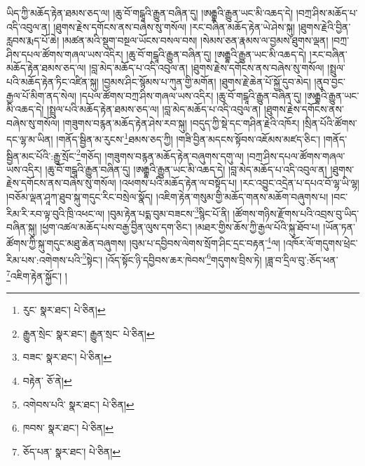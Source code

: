 ཡིད་ཀྱི་མཆོད་རྟེན་ཐམས་ཅད་ལ། །ཆུ་བོ་གངྒཱའི་རྒྱུན་བཞིན་དུ། །ཨརྒྷའི་རྒྱུན་ཡང་མི་འཆད་དེ། །བཀྲ་ཤིས་མཆོད་པ་འདི་འབུལ་ན། །ཐུགས་རྗེས་དགོངས་ནས་བཞེས་སུ་གསོལ། །རང་བཞིན་མཆོད་རྟེན་ཡེ་ཤེས་སྐུ། །ཐུགས་རྗེའི་བྱིན་རླབས་རྨད་པོ་ཆེ། །མཚན་མའི་སྡུག་བསྔལ་ཡོངས་བསལ་བས། །སེམས་ཅན་རྣམས་ལ་བྱམས་ཐུགས་ལྡན། །བཀྲ་ཤིས་དཔལ་ཚོགས་གཞལ་ཡས་འདིར། །ཆུ་བོ་གངྒཱའི་རྒྱུན་བཞིན་དུ། །ཨརྒྷའི་རྒྱུན་ཡང་མི་འཆད་དེ། །རང་བཞིན་མཆོད་རྟེན་ཐམས་ཅད་ལ། །བླ་མེད་མཆོད་པ་འདི་འབུལ་ན། །ཐུགས་རྗེས་དགོངས་ནས་བཞེས་སུ་གསོལ། །སྤྲུལ་པའི་མཆོད་རྟེན་ཏིང་འཛིན་སྐུ། །བྱམས་ཤིང་སྙོམས་པ་ཀུན་གྱི་མགོན། །ཐུགས་རྗེ་ཆེན་པོ་སྐྱོ་དུབ་མེད། །ནུབ་བྱང་རྒྱལ་པོ་མིག་ནད་སེལ། །དཔལ་ཚོགས་བཀྲ་ཤིས་གཞལ་ཡས་འདིར། །ཆུ་བོ་གངྒཱའི་རྒྱུན་བཞིན་དུ། །ཨརྒྷའི་རྒྱུན་ཡང་མི་འཆད་དེ། །སྤྲུལ་པའི་མཆོད་རྟེན་ཐམས་ཅད་ལ། །བླ་མེད་མཆོད་པ་འདི་འབུལ་ན། །ཐུགས་རྗེས་དགོངས་ནས་བཞེས་སུ་གསོལ། །གཟུགས་བརྙན་མཆོད་རྟེན་ཤེས་རབ་སྐུ། །བདུད་ཀྱི་སྡེ་དང་གཤིན་རྗེའི་འཁོར། །སྲིན་པོའི་ཚོགས་དང་ལྷ་མ་ཡིན། །གནོད་སྦྱིན་མ་རུངས་\footnote{རུང་  སྣར་ཐང་།  པེ་ཅིན། }ཐམས་ཅད་ཀྱི། །གཟི་བྱིན་མདངས་སྟོབས་འཇོམས་མཛད་ཅིང་། །གནོད་སྦྱིན་མང་པོའི་:རྒྱུ་སྲོང་\footnote{རྒྱུན་སྲེང་  སྣར་ཐང་། རྒྱུན་སྲང་  པེ་ཅིན། }གཅོད། །གཟུགས་བརྙན་མཆོད་རྟེན་བཞུགས་དགུ་ལ། །བཀྲ་ཤིས་དཔལ་ཚོགས་གཞལ་ཡས་འདིར། །ཆུ་བོ་གངྒཱའི་རྒྱུན་བཞིན་དུ། །ཨརྒྷའི་རྒྱུན་ཡང་མི་འཆད་དེ། །བླ་མེད་མཆོད་པ་འདི་འབུལ་ན། །ཐུགས་རྗེས་དགོངས་ནས་བཞེས་སུ་གསོལ། །འཕགས་པའི་མཆོད་རྟེན་ལ་བསྟོད་པ། །རང་འབྱུང་འདྲེན་པ་དཔའ་བོ་ལྷ་ཡི་ལྷ། །བཅོམ་ལྡན་ཤཱཀ་ཐུབ་སྐུ་གདུང་རིང་བསྲེལ་སྣོད། །འཇིག་རྟེན་གསུམ་གྱི་མཆོད་གནས་མཆོག་བཞུགས་པ། །བང་རིམ་རི་རབ་ལྟ་བུའི་ཁྲི་འཕང་ལ། །བུམ་རྟེན་པདྨ་བུམ་བཟངས་\footnote{བཟང་  སྣར་ཐང་།  པེ་ཅིན། }སྙིང་པོ་ནི། །ཚོགས་གཉིས་རྫོགས་པའི་འབྲས་བུ་ཡིད་བཞིན་སྐུ། །ཕྱག་འཚལ་མཆོད་པས་བརྒྱ་བྱིན་ལུས་དག་ཅིང་། །མཐར་གྱིས་ཆོས་ཀྱི་རྒྱལ་པོའི་སྐུ་ཐོབ་པ། །ཡོན་ཏན་ཚོགས་ཀྱི་སྐུ་གདུང་མཐུ་ཆེན་བཞུགས། །བུམ་པ་དབྱིབས་ལེགས་སྲོག་ཤིང་དྲང་བརྟན་\footnote{བརྟེན་  ཅོ་ནེ། }ལ། །འཁོར་ལོ་གདུགས་ཕྲེང་རིམ་པས་:འགེགས་པའི་\footnote{འགེབས་པའི་  སྣར་ཐང་།  པེ་ཅིན། }སྟེང་། །འོད་སྟོང་ཉི་དབྱིབས་ཆར་ཁེབས་\footnote{ཁབས་  སྣར་ཐང་།  པེ་ཅིན། }གདུགས་བྲིས་ཏེ། །ཟླ་བ་དྲིལ་བུ་:ཅོད་ཕན་\footnote{ཅོད་པན་  སྣར་ཐང་།  པེ་ཅིན། }འཇིག་རྟེན་སྐྱོང་། །
